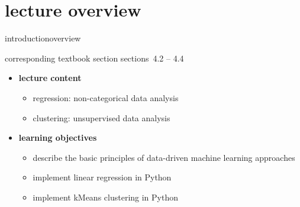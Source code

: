 


\subtitle{Module 4.2: Regression \& Clustering}


	

    \section[overview]{lecture overview}
        \begin{frame}{introduction}{overview}
            \begin{block}{corresponding textbook section}
                    sections~4.2 -- 4.4
            \end{block}

            \begin{itemize}
                \item   \textbf{lecture content}
                    \begin{itemize}
                        \item   regression: non-categorical data analysis
                        \item   clustering: unsupervised data analysis
                    \end{itemize}
                \bigskip
                \item<2->   \textbf{learning objectives}
                    \begin{itemize}
                        \item   describe the basic principles of data-driven machine learning approaches
                        \item   implement linear regression in Python
                        \item   implement kMeans clustering in Python 
                    \end{itemize}
            \end{itemize}
        \end{frame}


